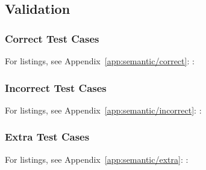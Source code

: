 \subsection{Validation}

\subsubsection{Correct Test Cases}

For listings, see Appendix~\ref{app:semantic/correct}: :



\subsubsection{Incorrect Test Cases}

For listings, see Appendix~\ref{app:semantic/incorrect}: :


\subsubsection{Extra Test Cases}

For listings, see Appendix~\ref{app:semantic/extra}: :

